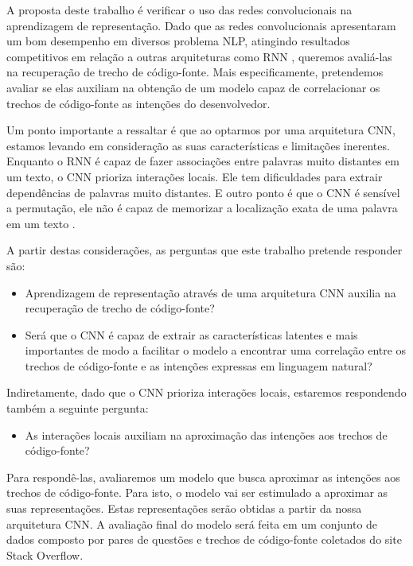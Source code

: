 A proposta deste trabalho é verificar o uso das redes convolucionais na aprendizagem de representação. Dado que as redes convolucionais apresentaram um bom desempenho em diversos problema NLP, atingindo resultados competitivos em relação a outras arquiteturas como RNN \citep{tom-young:trends-deep-learning-nlp}, queremos avaliá-las na recuperação de trecho de código-fonte. Mais especificamente, pretendemos avaliar se elas auxiliam na obtenção de um modelo capaz de correlacionar os trechos de código-fonte as intenções do desenvolvedor. 

Um ponto importante a ressaltar é que ao optarmos por uma arquitetura CNN, estamos levando em consideração as suas características e limitações inerentes. Enquanto o RNN é capaz de fazer associações entre palavras muito distantes em um texto, o CNN prioriza interações locais. Ele tem dificuldades para extrair dependências de palavras muito distantes. E outro ponto é que o CNN é sensível a permutação, ele não é capaz de memorizar a localização exata de uma palavra em um texto \citep{Goodfellow-et-al-2016:convolutional-networks, tom-young:trends-deep-learning-nlp}.

A partir destas considerações, as perguntas que este trabalho pretende responder são:

\begin{itemize}
    \item Aprendizagem de representação através de uma arquitetura CNN auxilia na recuperação de trecho de código-fonte?
    
    \item Será que o CNN é capaz de extrair as características latentes e mais importantes de modo a facilitar o modelo a encontrar uma correlação entre os trechos de código-fonte e as intenções expressas em linguagem natural?
\end{itemize}

Indiretamente, dado que o CNN prioriza interações locais, estaremos respondendo também a seguinte pergunta:
\begin{itemize}
        \item As interações locais auxiliam na aproximação das intenções aos trechos de código-fonte?
\end{itemize}

Para respondê-las, avaliaremos um modelo que busca aproximar as intenções aos trechos de código-fonte. Para isto, o modelo vai ser estimulado a aproximar as suas representações. Estas representações serão obtidas a partir da nossa arquitetura CNN. A avaliação final do modelo será feita em um conjunto de dados composto por pares de questões e trechos de código-fonte coletados do site Stack Overflow. 


